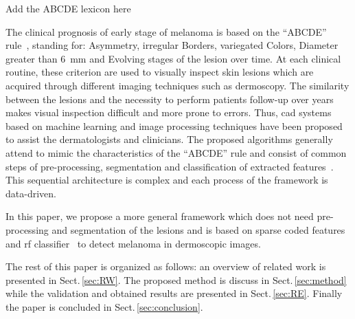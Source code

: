 {\color{red}Add the ABCDE lexicon here}

The clinical prognosis of early stage of melanoma is based on the ``ABCDE'' rule~\cite{abbasi2004early}, standing for: Asymmetry, irregular Borders, variegated Colors, Diameter greater than \SI{6}{\milli \meter} and Evolving stages of the lesion over time.
At each clinical routine, these criterion are used to visually inspect skin lesions which are acquired through different imaging techniques such as dermoscopy.
The similarity between the lesions and the necessity to perform patients follow-up over years makes visual inspection difficult and more prone to errors.
Thus, \ac{cad} systems based on machine learning and image processing techniques have been proposed to assist the dermatologists and clinicians. 
The proposed algorithms generally attend to mimic the characteristics of the ``ABCDE'' rule and consist of common steps of pre-processing, segmentation and classification of extracted features~\cite{rastgoo2015automatic}.
This sequential architecture is complex and each process of the framework is data-driven. 

In this paper, we propose a more general framework which does not need pre-processing and segmentation of the lesions and is based on sparse coded features and \ac{rf} classifier~\cite{breiman2001random} to detect melanoma in dermoscopic images. 

The rest of this paper is organized as follows: an overview of related work is presented in Sect.\,\ref{sec:RW}.
The proposed method is discuss in Sect.\,\ref{sec:method} while the validation and obtained results are presented in Sect.\,\ref{sec:RE}.
Finally the paper is concluded in Sect.\,\ref{sec:conclusion}.




